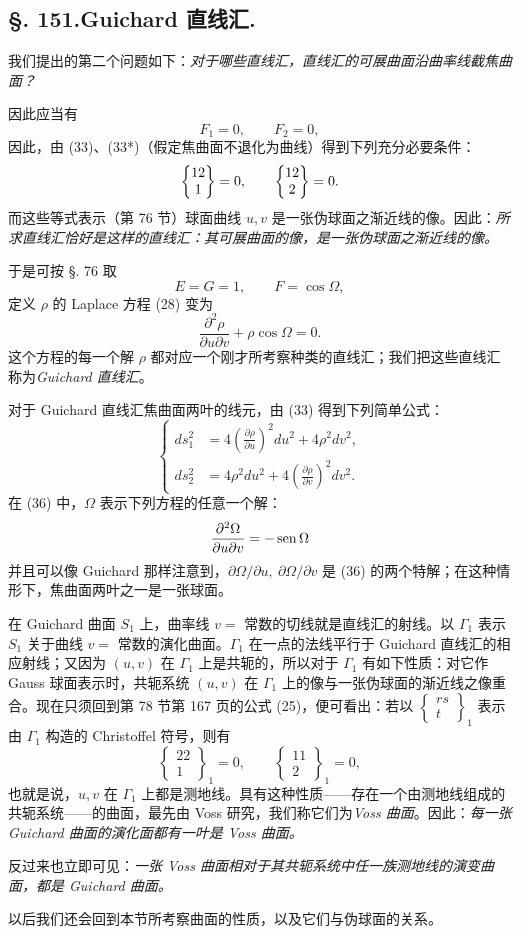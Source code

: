 \subsection*{\S. 151.\quad Guichard 直线汇.}

我们提出的第二个问题如下：\emph{对于哪些直线汇，直线汇的可展曲面沿曲率线截焦曲面？}

因此应当有
\[
 F_1=0,
 \qquad F_2=0,
\]
因此，由 (33)、(33*)（假定焦曲面不退化为曲线）得到下列充分必要条件：
\[
 \left\{\begin{matrix}12\\1\end{matrix}\right\}=0,
 \qquad
 \left\{\begin{matrix}12\\2\end{matrix}\right\}=0.
\]
而这些等式表示（第 76 节）球面曲线 \(u,v\) 是一张伪球面之渐近线的像。因此：\emph{所求直线汇恰好是这样的直线汇：其可展曲面的像，是一张伪球面之渐近线的像。}

于是可按 \S. 76 取
\[
 E=G=1,
 \qquad F=\cos\Omega,
\]
定义 \(\rho\) 的 Laplace 方程 (28) 变为
\begin{equation}\tag{36}
 \frac{\partial^2\rho}{\partial u\partial v}+\rho\cos\Omega=0.
\end{equation}
这个方程的每一个解 \(\rho\) 都对应一个刚才所考察种类的直线汇；我们把这些直线汇称为\emph{Guichard 直线汇}。

对于 Guichard 直线汇焦曲面两叶的线元，由 (33) 得到下列简单公式：
\[
\left\{
\begin{aligned}
ds_1^2&=4\left(\frac{\partial\rho}{\partial u}\right)^2du^2+4\rho^2dv^2,\\
ds_2^2&=4\rho^2du^2+4\left(\frac{\partial\rho}{\partial v}\right)^2dv^2.
\end{aligned}
\right.
\]
在 (36) 中，\(\Omega\) 表示下列方程的任意一个解：
\[
 \frac{\partial^2\Omega}{\partial u\partial v}=-\operatorname{sen}\Omega
\]
并且可以像 Guichard 那样注意到，\(\partial\Omega/\partial u,\ \partial\Omega/\partial v\) 是 (36) 的两个特解；在这种情形下，焦曲面两叶之一是一张球面。

在 Guichard 曲面 \(S_1\) 上，曲率线 \(v=\) 常数的切线就是直线汇的射线。以 \(\Gamma_1\) 表示 \(S_1\) 关于曲线 \(v=\) 常数的演化曲面。\(\Gamma_1\) 在一点的法线平行于 Guichard 直线汇的相应射线；又因为 \((u,v)\) 在 \(\Gamma_1\) 上是共轭的，所以对于 \(\Gamma_1\) 有如下性质：对它作 Gauss 球面表示时，共轭系统 \((u,v)\) 在 \(\Gamma_1\) 上的像与一张伪球面的渐近线之像重合。现在只须回到第 78 节第 167 页的公式 (25)，便可看出：若以 \(\left\{\begin{matrix}rs\\ t\end{matrix}\right\}_1\) 表示由 \(\Gamma_1\) 构造的 Christoffel 符号，则有
\[
 \left\{\begin{matrix}22\\1\end{matrix}\right\}_1=0,
 \qquad
 \left\{\begin{matrix}11\\2\end{matrix}\right\}_1=0,
\]
也就是说，\(u,v\) 在 \(\Gamma_1\) 上都是测地线。具有这种性质——存在一个由测地线组成的共轭系统——的曲面，最先由 Voss 研究，我们称它们为\emph{Voss 曲面}。因此：\emph{每一张 Guichard 曲面的演化面都有一叶是 Voss 曲面。}

反过来也立即可见：\emph{一张 Voss 曲面相对于其共轭系统中任一族测地线的演变曲面，都是 Guichard 曲面。}

以后我们还会回到本节所考察曲面的性质，以及它们与伪球面的关系。

